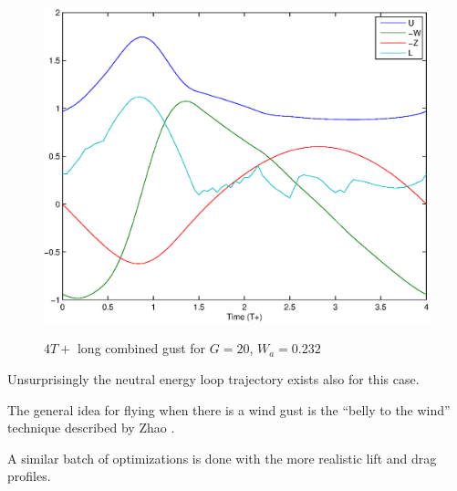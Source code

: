     \begin{figure}[h]
      \begin{center}
	\scalebox{0.8}
	{\includegraphics{./Figures/Windtype=3_Tg=4_Wg=0p232_quad_G=20.eps}}
      \end{center}
      \caption{$4T+$ long combined gust for $G=20$, $W_a=0.232$}
      \label{fig:combined_optimization}
    \end{figure}

    Unsurprisingly the neutral energy loop trajectory exists also for this case.

    \par The general idea for flying when there is a wind gust is the ``belly to the wind'' technique described by Zhao \cite{zhao2004optimal}.

    \FloatBarrier

    \par A similar batch of optimizations is done with the more realistic lift and drag profiles.


